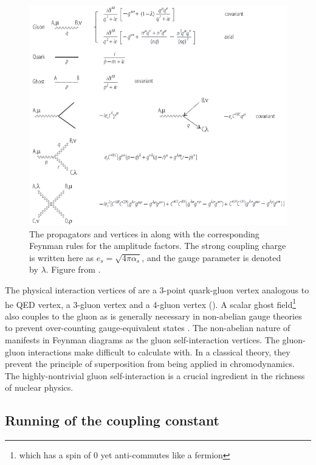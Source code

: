 \begin{figure}[t]
  \includegraphics{qcd_feynman.png}
  \caption{The propagators and vertices in \qcd along with the corresponding Feynman rules for the amplitude factors. The strong coupling charge is written here as $e_s = \sqrt{4\pi\alpha_s}$, and the gauge parameter is denoted by $\lambda$. Figure from .}
  \label{fig:qcd_feynman}
\end{figure}

The physical interaction vertices of \qcd are a 3-point quark-gluon vertex analogous to he \ac{QED} vertex, a 3-gluon vertex and a 4-gluon vertex ().
A scalar ghost field\footnote{which has a spin of 0 yet anti-commutes like a fermion} also couples to the gluon as is generally necessary in non-abelian gauge theories to prevent over-counting gauge-equivalent states \cite{Faddeev:1967fc}.
The non-abelian nature of \qcd manifests in Feynman diagrams as the gluon self-interaction vertices.
The gluon-gluon interactions make \qcd difficult to calculate with.
In a classical theory, they prevent the principle of superposition from being applied in chromodynamics.
The highly-nontrivial gluon self-interaction is a crucial ingredient in the richness of nuclear physics.


\subsection{Running of the coupling constant} %

